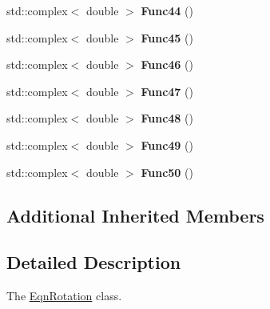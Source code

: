 \begin{DoxyCompactItemize}
\item 
\hypertarget{classosea_1_1ofreq_1_1_eqn_rotation_af67a3200196199215bbce93c9efc50cf}{std\-::complex$<$ double $>$ {\bfseries Func44} ()}\label{classosea_1_1ofreq_1_1_eqn_rotation_af67a3200196199215bbce93c9efc50cf}

\item 
\hypertarget{classosea_1_1ofreq_1_1_eqn_rotation_aa1a15e9f3c3dcf38147d8f097b89d4b2}{std\-::complex$<$ double $>$ {\bfseries Func45} ()}\label{classosea_1_1ofreq_1_1_eqn_rotation_aa1a15e9f3c3dcf38147d8f097b89d4b2}

\item 
\hypertarget{classosea_1_1ofreq_1_1_eqn_rotation_a4d3309b35331f3eb0e1838694e501283}{std\-::complex$<$ double $>$ {\bfseries Func46} ()}\label{classosea_1_1ofreq_1_1_eqn_rotation_a4d3309b35331f3eb0e1838694e501283}

\item 
\hypertarget{classosea_1_1ofreq_1_1_eqn_rotation_a8d7d1b3cceb79509f52352aa88d2780d}{std\-::complex$<$ double $>$ {\bfseries Func47} ()}\label{classosea_1_1ofreq_1_1_eqn_rotation_a8d7d1b3cceb79509f52352aa88d2780d}

\item 
\hypertarget{classosea_1_1ofreq_1_1_eqn_rotation_aab3be2b71a3aaeea29ce704bace8a6a1}{std\-::complex$<$ double $>$ {\bfseries Func48} ()}\label{classosea_1_1ofreq_1_1_eqn_rotation_aab3be2b71a3aaeea29ce704bace8a6a1}

\item 
\hypertarget{classosea_1_1ofreq_1_1_eqn_rotation_aa671d1bfbbc58ffd0fac10313fba487c}{std\-::complex$<$ double $>$ {\bfseries Func49} ()}\label{classosea_1_1ofreq_1_1_eqn_rotation_aa671d1bfbbc58ffd0fac10313fba487c}

\item 
\hypertarget{classosea_1_1ofreq_1_1_eqn_rotation_a701980d976bf59b9765f73834cd54e80}{std\-::complex$<$ double $>$ {\bfseries Func50} ()}\label{classosea_1_1ofreq_1_1_eqn_rotation_a701980d976bf59b9765f73834cd54e80}

\end{DoxyCompactItemize}
\subsection*{Additional Inherited Members}


\subsection{Detailed Description}
The \hyperlink{classosea_1_1ofreq_1_1_eqn_rotation}{Eqn\-Rotation} class. 

